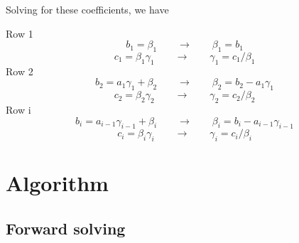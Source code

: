 \documentclass[landscape]{article}
\begin{document}
Solving for these coefficients, we have

\noindent
Row 1
\begin{equation}
  b_1 = \beta_1
  \qquad \rightarrow \qquad
  \beta_1 = b_1
\end{equation}
\begin{equation}
  c_1 = \beta_1 \gamma_1
  \qquad \rightarrow \qquad
  \gamma_1 = c_1/\beta_1
\end{equation}
Row 2
\begin{equation}
  b_2 = a_1 \gamma_1 + \beta_2
  \qquad \rightarrow \qquad
  \beta_2 = b_2 - a_1 \gamma_1
\end{equation}
\begin{equation}
  c_2 = \beta_2 \gamma_2
  \qquad \rightarrow \qquad
  \gamma_2 = c_2/\beta_2
\end{equation}
Row i
\begin{equation}
  b_i = a_{i-1} \gamma_{i-1} + \beta_{i}
  \qquad \rightarrow \qquad
  \beta_i = b_i - a_{i-1} \gamma_{i-1}
\end{equation}
\begin{equation}
  c_i = \beta_i \gamma_i
  \qquad \rightarrow \qquad
  \gamma_i = c_i/\beta_i
\end{equation}

\section{Algorithm}

\subsection{Forward solving}
\end{document}
